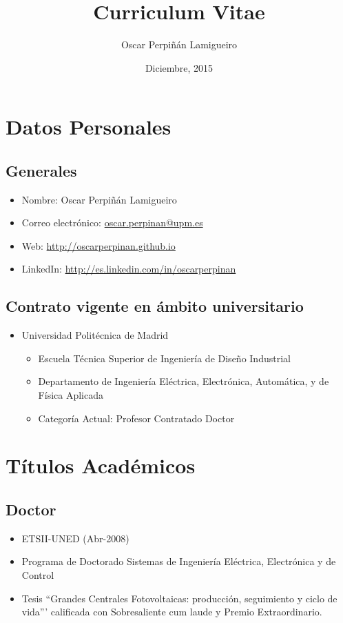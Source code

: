 \documentclass[article, a4paper]{memoir}
\author{Oscar Perpiñán Lamigueiro}
\date{Diciembre, 2015}
\title{Curriculum Vitae}
\begin{document}
\maketitle

\section{Datos Personales}
\label{sec-1}

\subsection{Generales}
\label{sec-1-1}

\begin{itemize}
\item Nombre: Oscar Perpiñán Lamigueiro
\item Correo electrónico: \href{mailto:oscar.perpinan@upm.es}{oscar.perpinan@upm.es}
\item Web: \url{http://oscarperpinan.github.io}
\item LinkedIn: \url{http://es.linkedin.com/in/oscarperpinan}
\end{itemize}

\subsection{Contrato vigente en ámbito universitario}
\label{sec-1-2}

\begin{itemize}
\item Universidad Politécnica de Madrid
\begin{itemize}
\item Escuela Técnica Superior de Ingeniería de Diseño Industrial
\item Departamento de Ingeniería Eléctrica, Electrónica, Automática, y de Física Aplicada
\item Categoría Actual: Profesor Contratado Doctor
\end{itemize}
\end{itemize}


\section{Títulos Académicos}
\label{sec-2}

\subsection{Doctor}
\label{sec-2-1}
\begin{itemize}
\item ETSII-UNED (Abr-2008)
\item Programa de Doctorado \guillemotleft{}Sistemas de Ingeniería Eléctrica, Electrónica y de Control\guillemotright{}
\item Tesis ``Grandes Centrales Fotovoltaicas: producción, seguimiento y ciclo de vida''' calificada con Sobresaliente cum laude y Premio Extraordinario.
\end{itemize}
\end{document}
